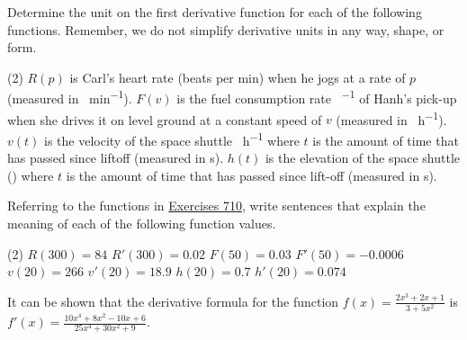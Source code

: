 \documentclass[12pt,]{book}
\theoremstyle{plain}
\theoremstyle{definition}
\numberwithin{equation}{section}
\newcommand{\fe}[2]{#1\mathopen{}\left(#2\right)\mathclose{}}
\newcommand{\fd}[1]{#1'}
\begin{document}
Determine the unit on the first derivative function for each of the following functions.  Remember, we do not simplify derivative units in any way, shape, or form.%
\par
\begin{exercisegroup}(2)
\exercise[7.]\hypertarget{exercise-derivative-units-supplement-first}{\null}\(\fe{R}{p}\) is Carl's heart rate (beats per min) when he jogs at a rate of \(p\) (measured in \si{\foot\per\minute}).%
\exercise[8.]\hypertarget{exercise-208}{\null}\(\fe{F}{v}\) is the fuel consumption rate \si{\gallon\per\mile} of Hanh's pick-up when she drives it on level ground at a constant speed of \(v\) (measured in \si{\mile\per\hour}).%
\exercise[9.]\hypertarget{exercise-209}{\null}\(\fe{v}{t}\) is the velocity of the space shuttle  \si{\mile\per\hour} where \(t\) is the amount of time that has passed since liftoff (measured in \si{\second}).%
\exercise[10.]\hypertarget{exercise-derivative-units-supplement-last}{\null}\(\fe{h}{t}\) is the elevation of the space shuttle (\si{\mile}) where \(t\) is the amount of time that has passed since lift-off (measured in \si{\second}).%
\end{exercisegroup}
\par\smallskip\noindent
Referring to the functions in \hyperlink{exercise-derivative-units-supplement-first}{Exercises 7}\textendash{}\hyperlink{exercise-derivative-units-supplement-last}{10}, write sentences that explain the meaning of each of the following function values.%
\par
\begin{exercisegroup}(2)
\exercise[11.]\hypertarget{exercise-211}{\null}\(\fe{R}{300}=84\)%
\exercise[12.]\hypertarget{exercise-212}{\null}\(\fe{\fd{R}}{300}=0.02\)%
\exercise[13.]\hypertarget{exercise-213}{\null}\(\fe{F}{50}=0.03\)%
\exercise[14.]\hypertarget{exercise-214}{\null}\(\fe{\fd{F}}{50}=-0.0006\)%
\exercise[15.]\hypertarget{exercise-215}{\null}\(\fe{v}{20}=266\)%
\exercise[16.]\hypertarget{exercise-216}{\null}\(\fe{\fd{v}}{20}=18.9\)%
\exercise[17.]\hypertarget{exercise-217}{\null}\(\fe{h}{20}=0.7\)%
\exercise[18.]\hypertarget{exercise-218}{\null}\(\fe{\fd{h}}{20}=0.074\)%
\end{exercisegroup}
\par\smallskip\noindent
It can be shown that the derivative formula for the function \(\fe{f}{x}=\frac{2x^3+2x+1}{3+5x^2}\) is \(\fe{\fd{f}}{x}=\frac{10x^4+8x^2-10x+6}{25x^4+30x^2+9}\).%
\par
\end{document}
